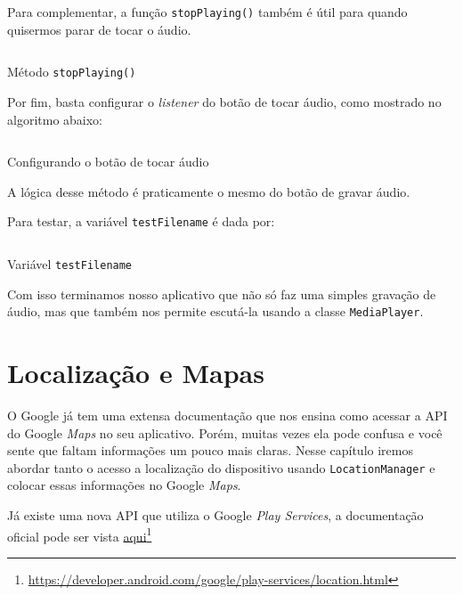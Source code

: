 \documentclass[a4paper,12pt,brazil]{book}
\begin{document}
\begin{singlespace}
		Para complementar, a função \texttt{stopPlaying()} também é útil para quando quisermos parar de tocar o áudio.
		
		\begin{listing}[H]
		\inputminted[linenos=true,fontsize=\small,frame=lines, framesep=2mm, tabsize=2,numbersep=5pt]{java}{src/api/audio/stoplaying.java}
		\caption{Método \texttt{stopPlaying()}}
		\label{code:audiostopplaying}
		\end{listing} 		

		Por fim, basta configurar o \emph{listener} do botão de tocar áudio, como mostrado no algoritmo abaixo:

		\begin{listing}[H]
		\inputminted[linenos=true,fontsize=\small,frame=lines, framesep=2mm, tabsize=2,numbersep=5pt]{java}{src/api/audio/playlistener.java}
		\caption{Configurando o botão de tocar áudio}
		\label{code:audioplaylistener}
		\end{listing} 		

		A lógica desse método é praticamente o mesmo do botão de gravar áudio. 

		Para testar, a variável \texttt{testFilename} é dada por:

		\begin{listing}[H]
		\inputminted[linenos=true,fontsize=\small,frame=lines, framesep=2mm, tabsize=2,numbersep=5pt]{java}{src/api/audio/testfilename.java}
		\caption{Variável \texttt{testFilename}}
		\label{code:audiofile}
		\end{listing} 		


		Com isso terminamos nosso aplicativo que não só faz uma simples gravação de áudio, mas que também nos permite escutá-la usando a classe \texttt{MediaPlayer}.

\chapter{Localização e Mapas}

		O Google já tem uma extensa documentação que nos ensina como acessar a API do Google \emph{Maps} no seu aplicativo. Porém, muitas vezes ela pode confusa e você sente que faltam informações um pouco mais claras. Nesse capítulo iremos abordar tanto o acesso a localização do dispositivo usando \texttt{LocationManager} e colocar essas informações no Google \emph{Maps}.

		Já existe uma nova API que utiliza o Google \emph{Play Services}, a documentação oficial pode ser vista \href{https://developer.android.com/google/play-services/location.html}{aqui}\footnote{\href{https://developer.android.com/google/play-services/location.html}{https://developer.android.com/google/play-services/location.html}}


\end{singlespace}
\end{document}
